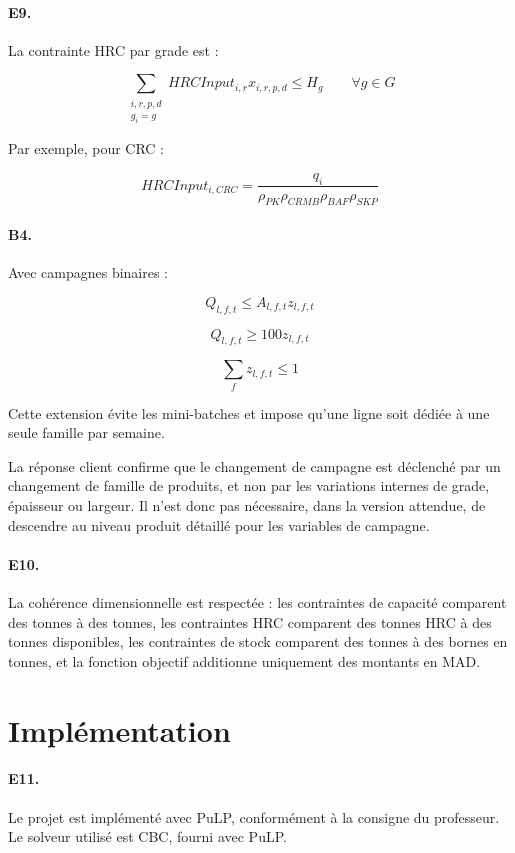 \documentclass[12pt,a4paper]{article}
\newcommand{\question}[1]{\paragraph{\textcolor{blue!50!black}{#1.}}}
\newcommand{\sectiontarget}[1]{}
\begin{document}
\question{E9}
La contrainte HRC par grade est :

\begin{equation}
\sum_{\substack{i,r,p,d\\g_i=g}}
HRCInput_{i,r}x_{i,r,p,d}
\leq H_g
\qquad \forall g\in G
\end{equation}

Par exemple, pour CRC :

\begin{equation}
HRCInput_{i,CRC} =
\frac{q_i}{\rho_{PK}\rho_{CRMB}\rho_{BAF}\rho_{SKP}}
\end{equation}

\question{B4}
Avec campagnes binaires :

\begin{equation}
Q_{l,f,t}\leq A_{l,f,t}z_{l,f,t}
\end{equation}

\begin{equation}
Q_{l,f,t}\geq 100z_{l,f,t}
\end{equation}

\begin{equation}
\sum_f z_{l,f,t}\leq 1
\end{equation}

Cette extension évite les mini-batches et impose qu'une ligne soit dédiée à une seule famille par semaine.

La réponse client confirme que le changement de campagne est déclenché par un changement de famille de produits, et non par les variations internes de grade, épaisseur ou largeur. Il n'est donc pas nécessaire, dans la version attendue, de descendre au niveau produit détaillé pour les variables de campagne.

\question{E10}
La cohérence dimensionnelle est respectée : les contraintes de capacité comparent des tonnes à des tonnes, les contraintes HRC comparent des tonnes HRC à des tonnes disponibles, les contraintes de stock comparent des tonnes à des bornes en tonnes, et la fonction objectif additionne uniquement des montants en MAD.

\clearpage
\section{Implémentation}
\sectiontarget{2 a 3 pages}

\question{E11}
Le projet est implémenté avec PuLP, conformément à la consigne du professeur. Le solveur utilisé est CBC, fourni avec PuLP.
\end{document}
